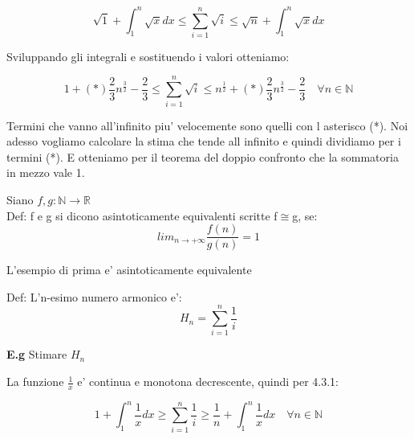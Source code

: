 \documentclass{article}
\begin{document}
        \begin{equation*}
          \sqrt{1}+\int^n_1 \sqrt{x}dx \leq \sum^n_{i=1} \sqrt{i} \leq \sqrt{n} + \int^n_1 \sqrt{x}dx
        \end{equation*}
        \begin{flushleft}
          Sviluppando gli integrali e sostituendo i valori otteniamo:
        \end{flushleft}
        \begin{equation*}
          1+(*)\frac{2}{3}n^{\frac{3}{2}}-\frac{2}{3} \leq \sum^n_{i=1} \sqrt{i} \leq n^{\frac{1}{2}}+(*)\frac{2}{3}n^{\frac{3}{2}}-\frac{2}{3} \quad \forall n \in \mathbb{N}
        \end{equation*}
        \begin{flushleft}
          Termini che vanno all'infinito piu' velocemente sono quelli con l asterisco (*).
          Noi adesso vogliamo calcolare la stima che tende all infinito e quindi dividiamo per i termini (*).
          E otteniamo per il teorema del doppio confronto che la sommatoria in mezzo vale 1.
        \end{flushleft}
        \begin{flushleft}
          Siano $f,g:\mathbb{N} \to \mathbb{R}$\\
          Def: f e g si dicono asintoticamente equivalenti scritte f$\cong$g, se:
          \begin{equation*}
            lim_{n\to +\infty} \frac{f(n)}{g(n)} =1
          \end{equation*}
          \begin{flushleft}
            L'esempio di prima e' asintoticamente equivalente
          \end{flushleft}
          \begin{flushleft}
            Def: L'n-esimo numero armonico e':
            \begin{equation*}
              H_n=\sum_{i=1}^n \frac{1}{i}
            \end{equation*}
          \end{flushleft}
        \end{flushleft}
        \begin{flushleft}
          \textbf{E.g} Stimare $H_n$
        \end{flushleft}
        \begin{flushleft}
          La funzione $\frac{1}{x}$ e' continua e monotona decrescente, quindi per 4.3.1:
        \end{flushleft}
        \begin{equation*}
          1+\int_1^n \frac{1}{x}dx\geq \sum_{i=1}^n \frac{1}{i} \geq \frac{1}{n}+\int^n_1 \frac{1}{x}dx \quad \forall n \in \mathbb{N}
        \end{equation*}
\end{document}
